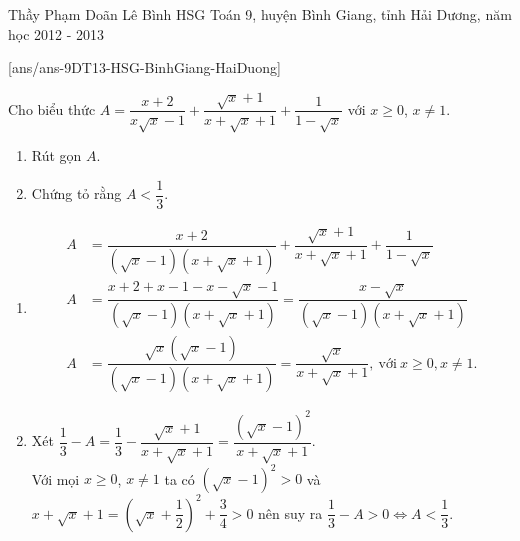 \begin{name}
{Thầy  Phạm Doãn Lê Bình}
{HSG Toán 9, huyện Bình Giang, tỉnh Hải Dương, năm học 2012 - 2013}
\end{name}
\setcounter{ex}{0}
[ans/ans-9DT13-HSG-BinhGiang-HaiDuong]
\begin{ex}%
	Cho biểu thức $A=\dfrac{x+2}{x\sqrt{x}-1} + \dfrac{\sqrt{x}+1}{x+\sqrt{x}+1} + \dfrac{1}{1-\sqrt{x}}$ với $x\ge 0$, $x\ne 1$.
    \begin{enumerate}
    \item Rút gọn $A$.
    \item Chứng tỏ rằng $A < \dfrac{1}{3}$.
    \end{enumerate}
\loigiai
    {
    \begin{enumerate}
    \item 
    	\begin{align*}
    	A & = \dfrac{x+2}{(\sqrt{x}-1)(x+\sqrt{x}+1)} + \dfrac{\sqrt{x}+1}{x+\sqrt{x}+1} + \dfrac{1}{1-\sqrt{x}}\\
    	A & = \dfrac{x+2+x-1-x-\sqrt{x}-1}{(\sqrt{x}-1)(x+\sqrt{x}+1)} = \dfrac{x-\sqrt{x}}{(\sqrt{x}-1)(x+\sqrt{x}+1)}\\
    	A & = \dfrac{\sqrt{x}(\sqrt{x}-1)}{(\sqrt{x}-1)(x+\sqrt{x}+1)} = \dfrac{\sqrt{x}}{x+\sqrt{x}+1},\ \text{với} \ x\ge 0, x\ne 1.
    	\end{align*}
    \item Xét $\dfrac{1}{3} - A = \dfrac{1}{3} - \dfrac{\sqrt{x}+1}{x+\sqrt{x}+1} = \dfrac{(\sqrt{x}-1)^2}{x+\sqrt{x}+1}$.\\
    	Với mọi $x\ge 0$, $x\ne 1$ ta có $(\sqrt{x}-1)^2 > 0$ và $x+\sqrt{x}+1 = \left(\sqrt{x}+\dfrac{1}{2} \right)^2 + \dfrac{3}{4} > 0$ nên suy ra $\dfrac{1}{3} - A > 0 \Leftrightarrow A < \dfrac{1}{3}$.
    \end{enumerate}
    }
\end{ex}

